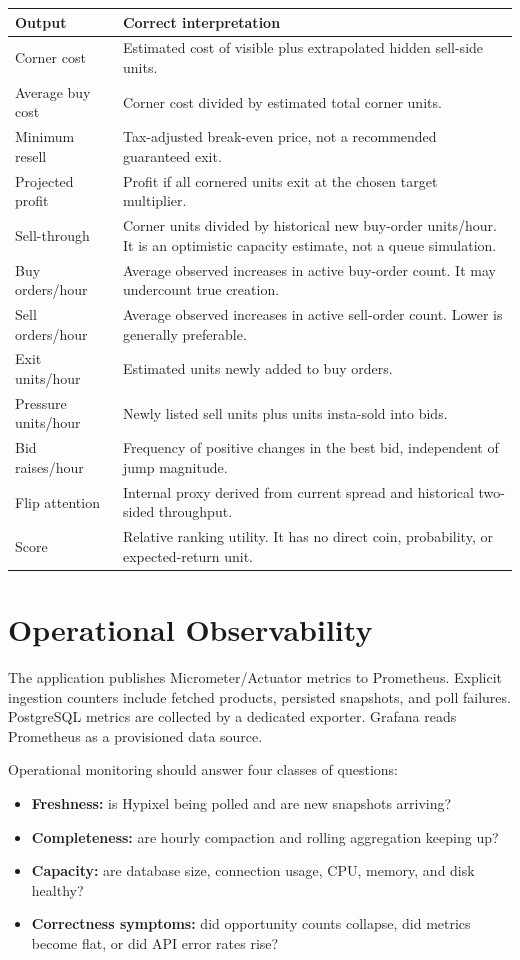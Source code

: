 \documentclass[11pt,a4paper]{article}
\begin{document}
\begin{longtable}{p{}p{}}
\toprule
Output & Correct interpretation\\
\midrule
\endhead
Corner cost & Estimated cost of visible plus extrapolated hidden sell-side units.\\
Average buy cost & Corner cost divided by estimated total corner units.\\
Minimum resell & Tax-adjusted break-even price, not a recommended guaranteed exit.\\
Projected profit & Profit if all cornered units exit at the chosen target multiplier.\\
Sell-through & Corner units divided by historical new buy-order units/hour. It is an optimistic
capacity estimate, not a queue simulation.\\
Buy orders/hour & Average observed increases in active buy-order count. It may undercount true creation.\\
Sell orders/hour & Average observed increases in active sell-order count. Lower is generally preferable.\\
Exit units/hour & Estimated units newly added to buy orders.\\
Pressure units/hour & Newly listed sell units plus units insta-sold into bids.\\
Bid raises/hour & Frequency of positive changes in the best bid, independent of jump magnitude.\\
Flip attention & Internal proxy derived from current spread and historical two-sided throughput.\\
Score & Relative ranking utility. It has no direct coin, probability, or expected-return unit.\\
\bottomrule
\end{longtable}

\section{Operational Observability}

The application publishes Micrometer/Actuator metrics to Prometheus. Explicit ingestion
counters include fetched products, persisted snapshots, and poll failures. PostgreSQL metrics
are collected by a dedicated exporter. Grafana reads Prometheus as a provisioned data source.

Operational monitoring should answer four classes of questions:

\begin{itemize}
  \item \textbf{Freshness:} is Hypixel being polled and are new snapshots arriving?
  \item \textbf{Completeness:} are hourly compaction and rolling aggregation keeping up?
  \item \textbf{Capacity:} are database size, connection usage, CPU, memory, and disk healthy?
  \item \textbf{Correctness symptoms:} did opportunity counts collapse, did metrics become flat,
  or did API error rates rise?
\end{itemize}
\end{document}
